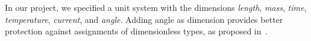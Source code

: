 %

In our project, we specified a unit system with the dimensions \emph{length}, \emph{mass}, \emph{time}, \emph{temperature}, \emph{current}, and \emph{angle}. 
Adding angle as dimension provides better protection against assignments of dimensionless types, as proposed in~\cite{Xiang2015}.







